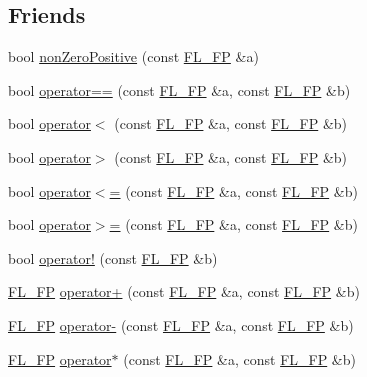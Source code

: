 \subsection*{Friends}
\begin{DoxyCompactItemize}
\item 
bool \hyperlink{class_f_l___f_p_a9edcf609bd52b6d25b394bf8b1a22819}{non\+Zero\+Positive} (const \hyperlink{class_f_l___f_p}{F\+L\+\_\+\+FP} \&a)
\item 
bool \hyperlink{class_f_l___f_p_a7f68a65590040b22d55e29f700a70090}{operator==} (const \hyperlink{class_f_l___f_p}{F\+L\+\_\+\+FP} \&a, const \hyperlink{class_f_l___f_p}{F\+L\+\_\+\+FP} \&b)
\item 
bool \hyperlink{class_f_l___f_p_a7a645d400e5b6aeaf8a3ea2a4512ab9e}{operator$<$} (const \hyperlink{class_f_l___f_p}{F\+L\+\_\+\+FP} \&a, const \hyperlink{class_f_l___f_p}{F\+L\+\_\+\+FP} \&b)
\item 
bool \hyperlink{class_f_l___f_p_ab237b013e66f2d39a3bb466e36741baf}{operator$>$} (const \hyperlink{class_f_l___f_p}{F\+L\+\_\+\+FP} \&a, const \hyperlink{class_f_l___f_p}{F\+L\+\_\+\+FP} \&b)
\item 
bool \hyperlink{class_f_l___f_p_a420177af32f27b84621b1bdc1db5d29a}{operator$<$=} (const \hyperlink{class_f_l___f_p}{F\+L\+\_\+\+FP} \&a, const \hyperlink{class_f_l___f_p}{F\+L\+\_\+\+FP} \&b)
\item 
bool \hyperlink{class_f_l___f_p_a496bb5bc687d589a5ec23c0b81dc5fb2}{operator$>$=} (const \hyperlink{class_f_l___f_p}{F\+L\+\_\+\+FP} \&a, const \hyperlink{class_f_l___f_p}{F\+L\+\_\+\+FP} \&b)
\item 
bool \hyperlink{class_f_l___f_p_a14d7541c865b9e57eaaca1c3fd2c6240}{operator!} (const \hyperlink{class_f_l___f_p}{F\+L\+\_\+\+FP} \&b)
\item 
\hyperlink{class_f_l___f_p}{F\+L\+\_\+\+FP} \hyperlink{class_f_l___f_p_a96dfe1fef405deebcdd77739a80baf4e}{operator+} (const \hyperlink{class_f_l___f_p}{F\+L\+\_\+\+FP} \&a, const \hyperlink{class_f_l___f_p}{F\+L\+\_\+\+FP} \&b)
\item 
\hyperlink{class_f_l___f_p}{F\+L\+\_\+\+FP} \hyperlink{class_f_l___f_p_a29c8d46e78c5c3a20fdfbf9904f0a25d}{operator-\/} (const \hyperlink{class_f_l___f_p}{F\+L\+\_\+\+FP} \&a, const \hyperlink{class_f_l___f_p}{F\+L\+\_\+\+FP} \&b)
\item 
\hyperlink{class_f_l___f_p}{F\+L\+\_\+\+FP} \hyperlink{class_f_l___f_p_a7c9e13210a3e8f9ef270a4895b1fc0d3}{operator$\ast$} (const \hyperlink{class_f_l___f_p}{F\+L\+\_\+\+FP} \&a, const \hyperlink{class_f_l___f_p}{F\+L\+\_\+\+FP} \&b)

\end{DoxyCompactItemize}
